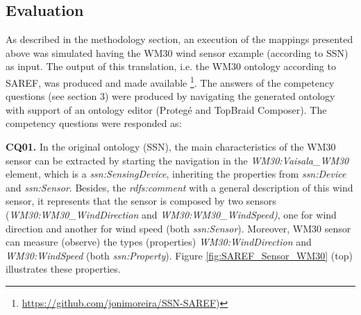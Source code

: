 \documentclass{sig-alternate-05-2015}
\begin{document}
\subsection{Evaluation}
As described in the methodology section, an execution of the mappings presented above was simulated having the WM30 wind sensor example (according to SSN) as input. The output of this translation, i.e. the WM30 ontology according to SAREF, was produced and made available \footnote{\url{https://github.com/jonimoreira/SSN-SAREF})}. The answers of the competency questions (see section 3) were produced by navigating the generated ontology with support of an ontology editor (Protegé and TopBraid Composer). The competency questions were responded as:

\noindent
\textbf{CQ01.} In the original ontology (SSN), the main characteristics of the WM30 sensor can be extracted by starting the navigation in the \textit{WM30:\-Vaisala\-\_WM30} element, which is a \textit{ssn:\-SensingDevice}, inheriting the properties from \textit{ssn:\-Device} and \textit{ssn:\-Sensor}. Besides, the \textit{rdfs:comment} with a general description of this wind sensor, it represents that the sensor is composed by two sensors (\textit{WM30:\-WM30\-\_Wind\-Direction} and \textit{WM30:\-WM30\-\_WindSpeed)}, one for wind direction and another for wind speed (both \textit{ssn:\-Sensor}). Moreover, WM30 sensor can measure (observe) the types (properties) \textit{WM30:\-WindDirection} and \textit{WM30:\-WindSpeed} (both \textit{ssn:\-Property}). Figure \ref{fig:SAREF_Sensor_WM30} (top) illustrates these properties.
\end{document}
